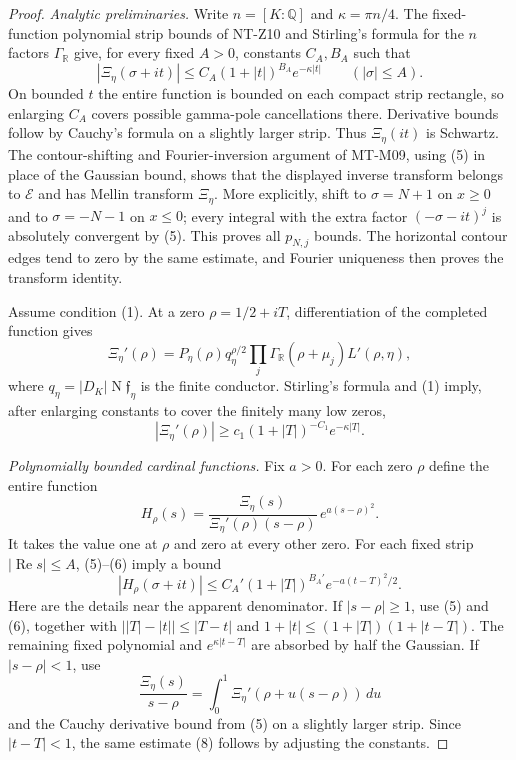 \documentclass[11pt,a4paper]{article}
\begin{document}
\begin{proof}
\emph{Analytic preliminaries.}
Write $n=[K:\mathbb Q]$ and $\kappa=\pi n/4$.
The fixed-function polynomial strip bounds of NT-Z10 and
Stirling's formula for the $n$ factors $\Gamma_{\mathbb R}$
give, for every fixed $A>0$, constants $C_A,B_A$ such that
\[
 |\Xi_\eta(\sigma+it)|
       \le C_A(1+|t|)^{B_A}e^{-\kappa|t|}
                            \qquad(|\sigma|\le A).     \tag{5}
\]
On bounded $t$ the entire function is bounded on each compact
strip rectangle, so enlarging $C_A$ covers possible gamma-pole
cancellations there. Derivative bounds follow by Cauchy's formula
on a slightly larger strip. Thus $\Xi_\eta(it)$ is Schwartz.
The contour-shifting and Fourier-inversion argument of MT-M09,
using (5) in place of the Gaussian bound, shows that the displayed
inverse transform belongs to $\mathcal E$ and has Mellin transform
$\Xi_\eta$. More explicitly, shift to $\sigma=N+1$ on $x\ge0$
and to $\sigma=-N-1$ on $x\le0$; every integral with the extra
factor $(-\sigma-it)^j$ is absolutely convergent by (5).
This proves all $p_{N,j}$ bounds. The horizontal contour edges
tend to zero by the same estimate, and Fourier uniqueness then
proves the transform identity.

Assume condition (1). At a zero $\rho=1/2+iT$, differentiation
of the completed function gives
\[
 \Xi_\eta'(\rho)
  =P_\eta(\rho)q_\eta^{\rho/2}
       \prod_j\Gamma_{\mathbb R}(\rho+\mu_j)L'(\rho,\eta),
\]
where $q_\eta=|D_K|\operatorname N\mathfrak f_\eta$
is the finite conductor.
Stirling's formula and (1) imply, after enlarging constants to
cover the finitely many low zeros,
\[
        |\Xi_\eta'(\rho)|
           \ge c_1(1+|T|)^{-C_1}e^{-\kappa|T|}.         \tag{6}
\]

\emph{Polynomially bounded cardinal functions.}
Fix $a>0$. For each zero $\rho$ define the entire function
\[
 H_\rho(s)=
     \frac{\Xi_\eta(s)}
          {\Xi_\eta'(\rho)(s-\rho)}\,e^{a(s-\rho)^2}.    \tag{7}
\]
It takes the value one at $\rho$ and zero at every other zero.
For each fixed strip $|\operatorname{Re}s|\le A$, (5)--(6)
imply a bound
\[
 |H_\rho(\sigma+it)|
       \le C_A'(1+|T|)^{B_A'}
                              e^{-a(t-T)^2/2}.         \tag{8}
\]
Here are the details near the apparent denominator. If
$|s-\rho|\ge1$, use (5) and (6), together with
$\big||T|-|t|\big|\le|T-t|$ and
$1+|t|\le(1+|T|)(1+|t-T|)$.
The remaining fixed polynomial and
$e^{\kappa|t-T|}$ are absorbed by half the Gaussian.
If $|s-\rho|<1$, use
\[
 \frac{\Xi_\eta(s)}{s-\rho}
       =\int_0^1\Xi_\eta'(\rho+u(s-\rho))\,du
\]
and the Cauchy derivative bound from (5) on a slightly larger
strip. Since $|t-T|<1$, the same estimate (8) follows by
adjusting the constants.


\end{proof}
\end{document}
